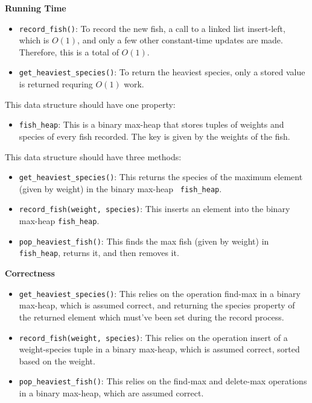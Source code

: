 \documentclass[12pt,twoside]{article}
\begin{document}
\begin{problems}
\begin{problemparts}
    \smallbreak

    {\bf Running Time} 
    \begin{itemize}
        \item {\tt record\_fish()}: To record the new fish, a call to a
        linked list insert-left, which is $ O(1) $, and only a few other
        constant-time updates are made. Therefore, this is a total of $ O(1) $.
        \item {\tt get\_heaviest\_species()}: To return the heaviest species,
        only a stored value is returned requring $ O(1) $ work.
    \end{itemize}

 This data structure should have one property:
    \begin{itemize}
        \item {\tt fish\_heap}: This is a binary max-heap that stores tuples
        of weights and species of every fish recorded. The key is given by
        the weights of the fish.
    \end{itemize}
    This data structure should have three methods:
    \begin{itemize}
        \item {\tt get\_heaviest\_species()}: This returns the species of the
        maximum element (given by weight) in the binary max-heap {\tt
        fish\_heap}.
        \item {\tt record\_fish(weight, species)}: This inserts an element into
        the binary max-heap {\tt fish\_heap}.
        \item {\tt pop\_heaviest\_fish()}: This finds the max fish (given by
        weight) in {\tt fish\_heap}, returns it, and then removes it.
    \end{itemize}

    \smallbreak

    {\bf Correctness}
    \begin{itemize}
        \item {\tt get\_heaviest\_species()}: This relies on the operation
        find-max in a binary max-heap, which is assumed correct, and
        returning the species property of the returned element which must've
        been set during the record process.
        \item {\tt record\_fish(weight, species)}: This relies on the
        operation insert of a weight-species tuple in a binary max-heap,
        which is assumed correct, sorted based on the weight.
        \item {\tt pop\_heaviest\_fish()}: This relies on the find-max and
        delete-max operations in a binary max-heap, which are assumed
        correct.
    \end{itemize}


\end{problemparts}
\end{problems}
\end{document}
